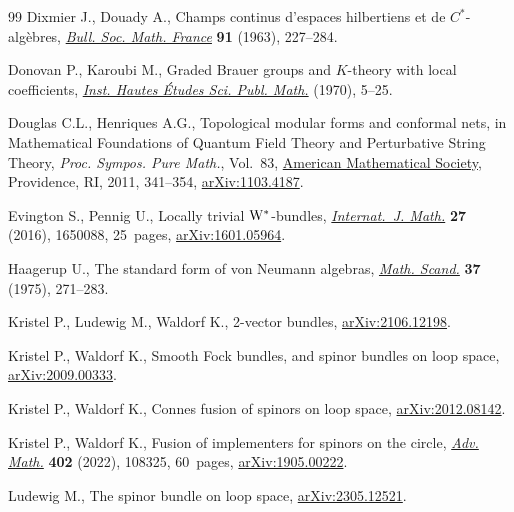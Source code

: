 \documentclass[11pt]{article}
\numberwithin{equation}{section}
\numberwithin{equation}{section}
\begin{document}
\begin{thebibliography}{99}
Dixmier J., Douady A., Champs continus d'espaces hilbertiens et de
 {$C^*$}-alg\`ebres, \href{https://doi.org/10.24033/bsmf.1596}{\textit{Bull. Soc. Math. France}} \textbf{91} (1963),
 227--284.

Donovan P., Karoubi M., Graded {B}rauer groups and {$K$}-theory with local
 coefficients,  \href{https://doi.org/10.24033/bsmf.1596}{\textit{Inst. Hautes \'Etudes Sci. Publ. Math.}} (1970), 5--25.

Douglas C.L., Henriques A.G., Topological modular forms and conformal nets, in
 Mathematical {F}oundations of {Q}uantum {F}ield {T}heory and {P}erturbative
 {S}tring {T}heory, \textit{Proc. Sympos. Pure Math.}, Vol.~83,  \href{https://doi.org/10.1090/pspum/083/2742433}{American
 Mathematical Society}, Providence, RI, 2011, 341--354, \href{https://arxiv.org/abs/1103.4187}{arXiv:1103.4187}.

Evington S., Pennig U., Locally trivial {${\rm W}^*$}-bundles,
 \href{https://doi.org/10.1142/S0129167X16500889}{\textit{Internat.~J. Math.}} \textbf{27} (2016), 1650088, 25~pages,
 \href{https://arxiv.org/abs/1601.05964}{arXiv:1601.05964}.

Haagerup U., The standard form of von {N}eumann algebras,  \href{https://doi.org/10.7146/math.scand.a-11606}{\textit{Math. Scand.}}
 \textbf{37} (1975), 271--283.

Kristel P., Ludewig M., Waldorf K., 2-vector bundles, \href{https://arxiv.org/abs/2106.12198}{arXiv:2106.12198}.

Kristel P., Waldorf K., Smooth {F}ock bundles, and spinor bundles on loop
 space, \href{https://arxiv.org/abs/2009.00333}{arXiv:2009.00333}.

Kristel P., Waldorf K., Connes fusion of spinors on loop space,
 \href{https://arxiv.org/abs/2012.08142}{arXiv:2012.08142}.

Kristel P., Waldorf K., Fusion of implementers for spinors on the circle,
 \href{https://doi.org/10.1016/j.aim.2022.108325}{\textit{Adv. Math.}} \textbf{402} (2022), 108325, 60~pages,
 \href{https://arxiv.org/abs/1905.00222}{arXiv:1905.00222}.

Ludewig M., The spinor bundle on loop space, \href{https://arxiv.org/abs/2305.12521}{arXiv:2305.12521}.


\end{thebibliography}
\end{document}
